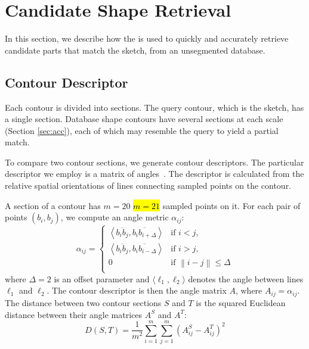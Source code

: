 
\section{Candidate Shape Retrieval}\label{sec:candshape}
In this section, we describe how the {\RCKNNG} is used to quickly and accurately retrieve candidate parts that match the sketch, from an unsegmented database.

\subsection{Contour Descriptor}\label{subsec:CtourDesc}
Each contour is divided into sections. The query contour, which is the sketch, has a single section. Database shape contours have several sections at each scale (Section \ref{sec:acc}), each of which may resemble the query to yield a partial match.

To compare two contour sections, we generate contour descriptors. The particular descriptor we employ is a matrix of angles~\cite{partialedgecontourriemeneccv2010}. The descriptor is calculated from the relative spatial orientations of lines connecting sampled points on the contour.

A section of a contour has \st{$m = 20$} \hl{$m = 21$} sampled points on it. For each pair of points $(b_i, b_j)$, we compute an angle metric $\alpha_{ij}$:
\[{\alpha _{ij}} = \left\{ {\begin{array}{*{20}{c}}
   {\left\langle {\overline {{b_i}{b_j}} ,\overline {{b_i}{b_{i + \Delta }}} } \right\rangle } & {\text{if~} i < j,}  \\
   {\left\langle {\overline {{b_i}{b_j}} ,\overline {{b_i}{b_{i - \Delta }}} } \right\rangle } & {\text{if~} i > j,}  \\
   0 & {\text{if~} \left\| {i - j} \right\| \le \Delta }  \\
\end{array}} \right.\]
where $\Delta = 2$ is an offset parameter and $\langle \ell_1, \ell_2 \rangle$ denotes the angle between lines $\ell_1$ and $\ell_2$. The contour descriptor is then the angle matrix $A$, where $A_{ij} = \alpha_{ij}$. The distance between two contour sections $S$ and $T$ is the squared Euclidean distance between their angle matrices $A^S$ and $A^T$:
\[
D(S, T) = \frac{1}{m^2} \sum_{i = 1}^m \sum_{j = 1}^m \left( A^S_{ij} - A^T_{ij} \right)^2
\]

